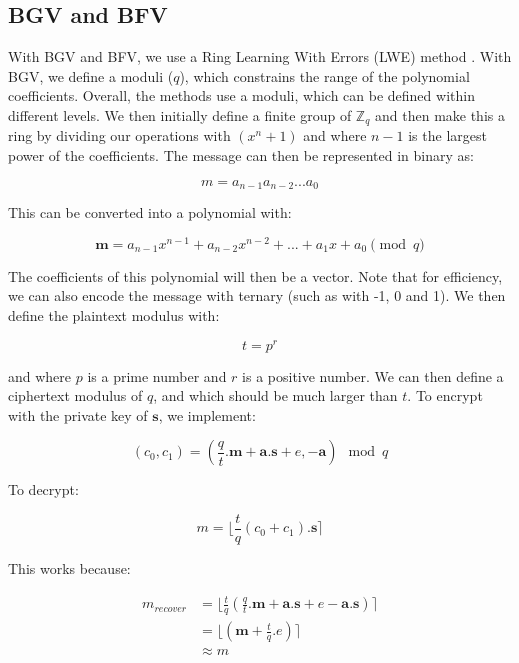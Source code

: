 \documentclass[envcountsame,runningheads,notitlepage]{llncs}
\begin{document}
\subsection{BGV and BFV}
With BGV and BFV, we use a Ring Learning With Errors (LWE) method \cite{brakerski2014efficient}.  With BGV, we define a moduli ($q$), which constrains the range of the polynomial coefficients. Overall, the methods use a moduli, which can be defined within different levels. We then initially define a finite group of $\mathbb{Z}_q$ and then make this a ring by dividing our operations with $(x^n+1)$ and where $n-1$ is the largest power of the coefficients. The message can then be represented in binary as:

\begin{equation}
m=a_{n-1}a_{n-2}...a_0
\end{equation}

This can be converted into a polynomial with:

\begin{equation}
\mathbf{m}=a_{n-1} x^{n-1} + a_{n-2} x^{n-2}+...+a_1 x + a_0 \pmod q
\end{equation}

The coefficients of this polynomial will then be a vector. Note that for efficiency, we can also encode the message with ternary (such as with -1, 0 and 1). We then define the plaintext modulus with:

\begin{equation}
t = p^r
\end{equation}

and where $p$ is a prime number and $r$ is a positive number. We can then define a ciphertext modulus of $q$, and which should be much larger than $t$. To encrypt with the private key of $\mathbf{s}$, we implement:

\begin{equation}
(c_0, c_1) =\left( \frac{q}{t}.\mathbf{m}  + \mathbf{a}.\mathbf{s} + e,\mathbf{-a} \right) \mod q
\end{equation}

To decrypt:

\begin{equation}
m = \bigl \lfloor \frac{t}{q}(c_0+c_1).\mathbf{s} \bigr \rceil
\end{equation}

This works because:

\begin{align}
m_{recover} &= \bigl \lfloor  \frac{t}{q}\left(\frac{q}{t}.\mathbf{m}  + \mathbf{a}.\mathbf{s} + e -\mathbf{a}.\mathbf{s} \right) \bigr \rceil\\
&= \bigl \lfloor \left( \mathbf{m}  + \frac{t}{q}.e  \right) 
 \bigr \rceil\\
 & \approx m 
\end{align}
\end{document}
